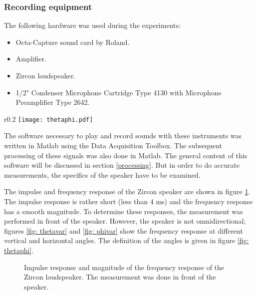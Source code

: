 \subsubsection{Recording equipment}
The following hardware was used during the experiments:
\begin{itemize}
	\setlength{\itemsep}{1pt}
  \setlength{\parskip}{0pt}
  \setlength{\parsep}{0pt}
	\item Octa-Capture sound card by Roland.
	\item Amplifier.
	\item Zircon loudspeaker.
	\item 1/2" Condenser Microphone Cartridge Type 4130 with Microphone Preamplifier Type 2642.
\end{itemize}

\begin{wrapfigure}{r}{0.2\textwidth}
  \centering
    \texttt{[image: thetaphi.pdf]}
  \caption{Definition of angles $\theta$ and $\phi$.}
  \label{fig: thetaphi}
\end{wrapfigure}
The software necessary to play and record sounds with these instruments was written in Matlab using the Data Acquisition Toolbox. The subsequent processing of these signals was also done in Matlab. The general content of this software will be discussed in section \ref{processing}. But in order to do accurate measurements, the specifics of the speaker have to be examined.

The impulse and frequency response of the Zircon speaker are shown in figure \ref{fig: ZirconImp}. The impulse response is rather short (less than 4 ms) and the frequency response has a smooth magnitude. To determine these responses, the measurement was performed in front of the speaker. However, the speaker is not omnidirectional; figures \ref{fig: thetavar} and \ref{fig: phivar} show the frequency response at different vertical and horizontal angles. The definition of the angles is given in figure \ref{fig: thetaphi}. 
\begin{figure}[h!]
  \centering
  \caption{Impulse response and magnitude of the frequency response of the Zircon loudspeaker. The measurement was done in front of the speaker. }
  \label{fig: ZirconImp}
\end{figure}



